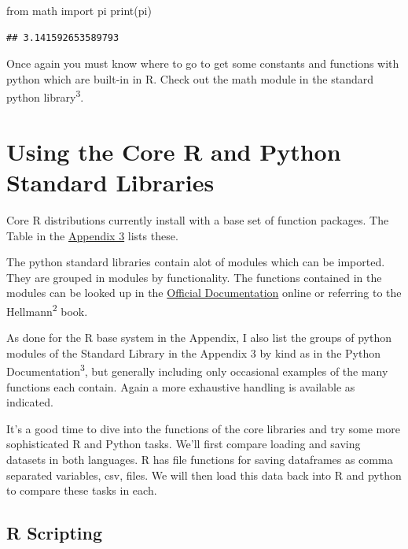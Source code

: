 \documentclass[]{book}
\newenvironment{Shaded}{\begin{snugshade}}{\end{snugshade}}
\newcommand{\ImportTok}[1]{#1}
\newcommand{\BuiltInTok}[1]{#1}
\newcommand{\NormalTok}[1]{#1}
\theoremstyle{definition}
\theoremstyle{definition}
\theoremstyle{definition}
\theoremstyle{remark}
\begin{document}
\begin{Shaded}
\begin{Highlighting}[]
\ImportTok{from}\NormalTok{ math }\ImportTok{import}\NormalTok{ pi}
\BuiltInTok{print}\NormalTok{(pi)}
\end{Highlighting}
\end{Shaded}

\begin{verbatim}
## 3.141592653589793
\end{verbatim}

Once again you must know where to go to get some constants and functions
with python which are built-in in R. Check out the math module in the
standard python library\textsuperscript{3}.

\section{Using the Core R and Python Standard
Libraries}\label{using-the-core-r-and-python-standard-libraries}

Core R distributions currently install with a base set of function
packages. The Table in the \href{17-Appendix_3_Packages.Rmd}{Appendix 3}
lists these.

The python standard libraries contain alot of modules which can be
imported. They are grouped in modules by functionality. The functions
contained in the modules can be looked up in the
\href{https://docs.python.org/3.7/}{Official Documentation} online or
referring to the Hellmann\textsuperscript{2} book.

As done for the R base system in the Appendix, I also list the groups of
python modules of the Standard Library in the Appendix 3 by kind as in
the Python Documentation\textsuperscript{3}, but generally including
only occasional examples of the many functions each contain. Again a
more exhaustive handling is available as indicated.

It's a good time to dive into the functions of the core libraries and
try some more sophisticated R and Python tasks. We'll first compare
loading and saving datasets in both languages. R has file functions for
saving dataframes as comma separated variables, csv, files. We will then
load this data back into R and python to compare these tasks in each.

\subsection{R Scripting}\label{r-scripting-3}
\end{document}
